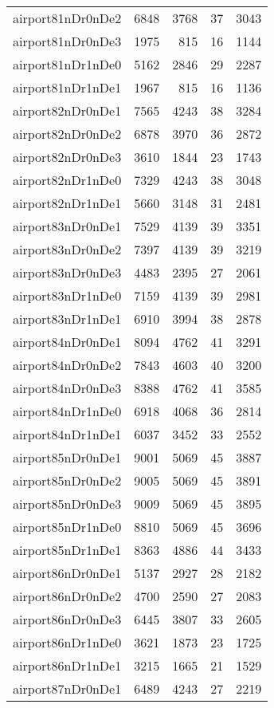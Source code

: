 \begin{longtable}{lrrrr}
airport81nDr0nDe2 & 6848 & 3768 & 37 & 3043 \\
airport81nDr0nDe3 & 1975 & 815 & 16 & 1144 \\
airport81nDr1nDe0 & 5162 & 2846 & 29 & 2287 \\
airport81nDr1nDe1 & 1967 & 815 & 16 & 1136 \\
airport82nDr0nDe1 & 7565 & 4243 & 38 & 3284 \\
airport82nDr0nDe2 & 6878 & 3970 & 36 & 2872 \\
airport82nDr0nDe3 & 3610 & 1844 & 23 & 1743 \\
airport82nDr1nDe0 & 7329 & 4243 & 38 & 3048 \\
airport82nDr1nDe1 & 5660 & 3148 & 31 & 2481 \\
airport83nDr0nDe1 & 7529 & 4139 & 39 & 3351 \\
airport83nDr0nDe2 & 7397 & 4139 & 39 & 3219 \\
airport83nDr0nDe3 & 4483 & 2395 & 27 & 2061 \\
airport83nDr1nDe0 & 7159 & 4139 & 39 & 2981 \\
airport83nDr1nDe1 & 6910 & 3994 & 38 & 2878 \\
airport84nDr0nDe1 & 8094 & 4762 & 41 & 3291 \\
airport84nDr0nDe2 & 7843 & 4603 & 40 & 3200 \\
airport84nDr0nDe3 & 8388 & 4762 & 41 & 3585 \\
airport84nDr1nDe0 & 6918 & 4068 & 36 & 2814 \\
airport84nDr1nDe1 & 6037 & 3452 & 33 & 2552 \\
airport85nDr0nDe1 & 9001 & 5069 & 45 & 3887 \\
airport85nDr0nDe2 & 9005 & 5069 & 45 & 3891 \\
airport85nDr0nDe3 & 9009 & 5069 & 45 & 3895 \\
airport85nDr1nDe0 & 8810 & 5069 & 45 & 3696 \\
airport85nDr1nDe1 & 8363 & 4886 & 44 & 3433 \\
airport86nDr0nDe1 & 5137 & 2927 & 28 & 2182 \\
airport86nDr0nDe2 & 4700 & 2590 & 27 & 2083 \\
airport86nDr0nDe3 & 6445 & 3807 & 33 & 2605 \\
airport86nDr1nDe0 & 3621 & 1873 & 23 & 1725 \\
airport86nDr1nDe1 & 3215 & 1665 & 21 & 1529 \\
airport87nDr0nDe1 & 6489 & 4243 & 27 & 2219 \\

\end{longtable}
